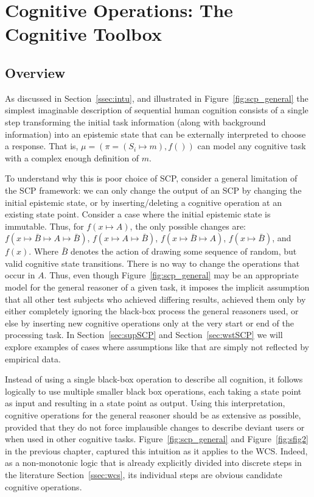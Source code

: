 \chapter{Cognitive Operations: The Cognitive Toolbox} \label{chp:toolbox}
\section{Overview}
As discussed in Section~\ref{ssec:intu}, and illustrated in Figure~\ref{fig:scp_general} the simplest imaginable description of sequential human cognition consists of a single step transforming the initial task information (along with background information) into an epistemic state that can be externally interpreted to choose a response. That is, $\mu=(\pi=(S_i \longmapsto m),f())$ can model any cognitive task with a complex enough definition of $m$.

To understand why this is poor choice of SCP, consider a general limitation of the SCP framework: we can only change the output of an SCP by changing the initial epistemic state, or by inserting/deleting a cognitive operation at an existing state point. Consider a case where the initial epistemic state is immutable. Thus, for $f(x \longmapsto A)$, the only possible changes are: $f(x \longmapsto \bar{B} \longmapsto A \longmapsto \bar{B})$, $f(x \longmapsto A \longmapsto \bar{B})$, $f(x \longmapsto \bar{B} \longmapsto A)$, $f(x \longmapsto \bar{B})$, and $f(x)$. Where $\bar{B}$ denotes the action of drawing some sequence of random, but valid cognitive state transitions. There is no way to change the operations that occur in $A$. Thus, even though Figure~\ref{fig:scp_general} may be an appropriate model for the general reasoner of a given task, it imposes the implicit assumption that all other test subjects who achieved differing results, achieved them only by either completely ignoring the black-box process the general reasoners used, or else by inserting new cognitive operations only at the very start or end of the processing task. In Section~\ref{sec:supSCP} and Section~\ref{sec:wstSCP} we will explore examples of cases where assumptions like that are simply not reflected by empirical data. 

Instead of using a single black-box operation to describe all cognition, it follows logically to use multiple smaller black box operations, each taking a state point as input and resulting in a state point as output. Using this interpretation, cognitive operations for the general reasoner should be as extensive as possible, provided that they do not force implausible changes to describe deviant users or when used in other cognitive tasks. Figure~\ref{fig:scp_general} and Figure~\ref{fig:sfig2} in the previous chapter, captured this intuition as it applies to the WCS. Indeed, as a non-monotonic logic that is already explicitly divided into discrete steps in the literature Section~\ref{ssec:wcs}, its individual steps are obvious candidate cognitive operations.

